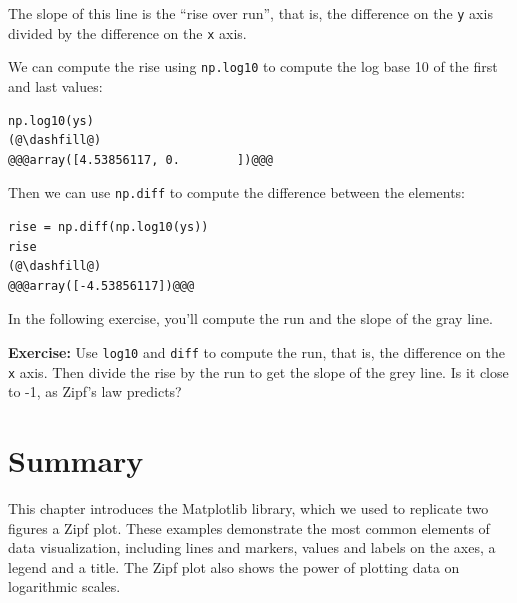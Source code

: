 The slope of this line is the ``rise over run'', that is, the difference
on the \passthrough{\lstinline!y!} axis divided by the difference on the
\passthrough{\lstinline!x!} axis.

We can compute the rise using \passthrough{\lstinline!np.log10!} to
compute the log base 10 of the first and last values:

\begin{lstlisting}[]
np.log10(ys)
(@\dashfill@)
@@@array([4.53856117, 0.        ])@@@
\end{lstlisting}

Then we can use \passthrough{\lstinline!np.diff!} to compute the
difference between the elements:

\begin{lstlisting}[]
rise = np.diff(np.log10(ys))
rise
(@\dashfill@)
@@@array([-4.53856117])@@@
\end{lstlisting}

In the following exercise, you'll compute the run and the slope of the
gray line.

\textbf{Exercise:} Use \passthrough{\lstinline!log10!} and
\passthrough{\lstinline!diff!} to compute the run, that is, the
difference on the \passthrough{\lstinline!x!} axis. Then divide the rise
by the run to get the slope of the grey line. Is it close to -1, as
Zipf's law predicts?

\hypertarget{summary}{%
\section{Summary}\label{summary}}

This chapter introduces the Matplotlib library, which we used to
replicate two figures a Zipf plot. These examples demonstrate the most
common elements of data visualization, including lines and markers,
values and labels on the axes, a legend and a title. The Zipf plot also
shows the power of plotting data on logarithmic scales.

